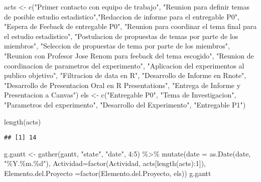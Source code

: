 \documentclass[
]{article}
\newenvironment{Shaded}{\begin{snugshade}}{\end{snugshade}}
\newcommand{\AttributeTok}[1]{\textcolor[rgb]{0.77,0.63,0.00}{#1}}
\newcommand{\DecValTok}[1]{\textcolor[rgb]{0.00,0.00,0.81}{#1}}
\newcommand{\FunctionTok}[1]{\textcolor[rgb]{0.00,0.00,0.00}{#1}}
\newcommand{\NormalTok}[1]{#1}
\newcommand{\OtherTok}[1]{\textcolor[rgb]{0.56,0.35,0.01}{#1}}
\newcommand{\SpecialCharTok}[1]{\textcolor[rgb]{0.00,0.00,0.00}{#1}}
\newcommand{\StringTok}[1]{\textcolor[rgb]{0.31,0.60,0.02}{#1}}
\begin{document}
\begin{Shaded}
\begin{Highlighting}[]
\NormalTok{acts }\OtherTok{\textless{}{-}} \FunctionTok{c}\NormalTok{(}\StringTok{"Primer contacto con equipo de trabajo"}\NormalTok{, }\StringTok{"Reunion para definir temas de posible estudio estadistico"}\NormalTok{,}\StringTok{"Redaccion de informe para el entregable P0"}\NormalTok{, }\StringTok{"Espera de Feeback de entregable P0"}\NormalTok{, }\StringTok{"Reunion para coordinar el tema final para el estudio estadistico"}\NormalTok{, }\StringTok{"Postulacion de propuestas de temas por parte de los miembros"}\NormalTok{, }\StringTok{"Seleccion de propuestas de tema por parte de los miembros"}\NormalTok{, }\StringTok{"Reunion con Profesor Jose Renom para feeback del tema escogido"}\NormalTok{, }\StringTok{"Reunion de coordinacion de parametros del experimento"}\NormalTok{, }\StringTok{"Aplicacion del experimentos al publico objetivo"}\NormalTok{, }\StringTok{"Filtracion de data en R"}\NormalTok{, }\StringTok{"Desarrollo de Informe en Rnote"}\NormalTok{, }\StringTok{"Desarrollo de Presentacion Oral en R Presentations"}\NormalTok{, }\StringTok{"Entrega de Informe y Presentacion a Canvas"}\NormalTok{)}
\NormalTok{els }\OtherTok{\textless{}{-}} \FunctionTok{c}\NormalTok{(}\StringTok{"Entregable P0"}\NormalTok{, }\StringTok{"Tema de Investigacion"}\NormalTok{, }\StringTok{"Parametros del experimento"}\NormalTok{, }\StringTok{"Desarrollo del Experimento"}\NormalTok{, }\StringTok{"Entregable P1"}\NormalTok{)}

\FunctionTok{length}\NormalTok{(acts)}
\end{Highlighting}
\end{Shaded}

\begin{verbatim}
## [1] 14
\end{verbatim}

\begin{Shaded}
\begin{Highlighting}[]
\NormalTok{g.gantt }\OtherTok{\textless{}{-}} \FunctionTok{gather}\NormalTok{(gantt, }\StringTok{"state"}\NormalTok{, }\StringTok{"date"}\NormalTok{, }\DecValTok{4}\SpecialCharTok{:}\DecValTok{5}\NormalTok{) }\SpecialCharTok{\%\textgreater{}\%} \FunctionTok{mutate}\NormalTok{(}\AttributeTok{date =} \FunctionTok{as.Date}\NormalTok{(date, }\StringTok{"\%Y.\%m.\%d"}\NormalTok{), }\AttributeTok{Actividad=}\FunctionTok{factor}\NormalTok{(Actividad, acts[}\FunctionTok{length}\NormalTok{(acts)}\SpecialCharTok{:}\DecValTok{1}\NormalTok{]), }\AttributeTok{Elemento.del.Proyecto =}\FunctionTok{factor}\NormalTok{(Elemento.del.Proyecto, els))}
\NormalTok{g.gantt}
\end{Highlighting}
\end{Shaded}
\end{document}
